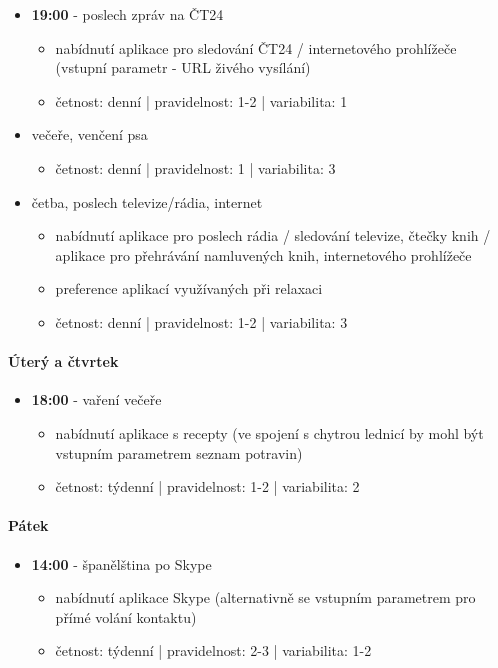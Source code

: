 \documentclass[thesis=M,czech]{FITthesis}[2012/06/26]
\begin{document}
\begin{itemize}
\begin{itemize}
\end{itemize}
    \item \textbf{19:00} - poslech zpráv na ČT24
\begin{itemize}
        \item nabídnutí aplikace pro sledování ČT24 / internetového prohlížeče (vstupní parametr - URL živého vysílání)
        \item četnost: denní | pravidelnost: 1-2 | variabilita: 1
\end{itemize}
    \item večeře, venčení psa
\begin{itemize}
        \item četnost: denní | pravidelnost: 1 | variabilita: 3
\end{itemize}
    \item četba, poslech televize/rádia, internet
\begin{itemize}
        \item nabídnutí aplikace pro poslech rádia / sledování televize, čtečky knih / aplikace pro přehrávání namluvených knih, internetového prohlížeče
        \item preference aplikací využívaných při relaxaci
        \item četnost: denní | pravidelnost: 1-2 | variabilita: 3
\end{itemize}
\end{itemize}

\paragraph{Úterý a čtvrtek}
\begin{itemize}
    \item \textbf{18:00} - vaření večeře
\begin{itemize}
        \item nabídnutí aplikace s recepty (ve spojení s chytrou lednicí by mohl být vstupním parametrem seznam potravin)

        \item četnost: týdenní | pravidelnost: 1-2 | variabilita: 2
\end{itemize}
\end{itemize}

\paragraph{Pátek}
\begin{itemize}
    \item \textbf{14:00} - španělština po Skype
\begin{itemize}
        \item nabídnutí aplikace Skype (alternativně se vstupním parametrem pro přímé volání kontaktu)

        \item četnost: týdenní | pravidelnost: 2-3 | variabilita: 1-2
\end{itemize}
\end{itemize}
\end{document}
